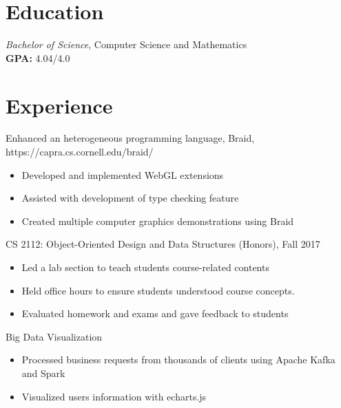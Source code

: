 \documentclass{resume}
\begin{document}



\section{Education}
\textit{Bachelor of Science}, Computer Science and Mathematics\\
\textbf{GPA: }4.04/4.0

\section{Experience}
Enhanced an heterogeneous programming language, Braid, https://capra.cs.cornell.edu/braid/
\begin{itemize}
  \item Developed and implemented WebGL extensions
  \item Assisted with development of type checking feature
  \item Created multiple computer graphics demonstrations using Braid
\end{itemize}

CS 2112: Object-Oriented Design and Data Structures (Honors), Fall 2017
\begin{itemize}
  \item Led a lab section to teach students course-related contents
  \item Held office hours to ensure students understood course concepts.
  \item Evaluated homework and exams and gave feedback to students
\end{itemize}

Big Data Visualization
\begin{itemize}
  \item Processed business requests from thousands of clients using Apache Kafka and Spark
  \item Visualized users information with echarts.js 
\end{itemize}
\end{document}
